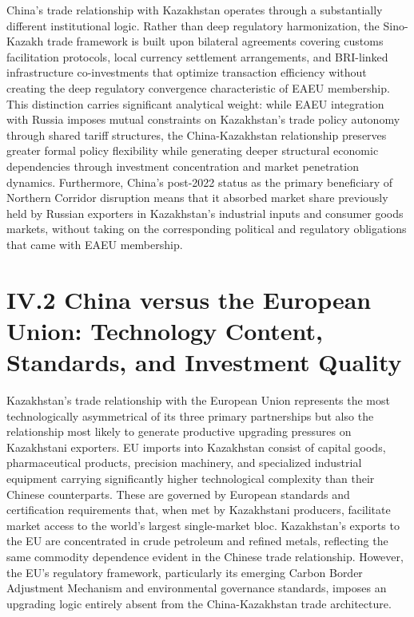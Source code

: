 \documentclass[12pt]{article}
\begin{document}
China's trade relationship with Kazakhstan operates through a substantially different institutional logic. Rather than deep regulatory harmonization, the Sino-Kazakh trade framework is built upon bilateral agreements covering customs facilitation protocols, local currency settlement arrangements, and BRI-linked infrastructure co-investments that optimize transaction efficiency without creating the deep regulatory convergence characteristic of EAEU membership. This distinction carries significant analytical weight: while EAEU integration with Russia imposes mutual constraints on Kazakhstan's trade policy autonomy through shared tariff structures, the China-Kazakhstan relationship preserves greater formal policy flexibility while generating deeper structural economic dependencies through investment concentration and market penetration dynamics. Furthermore, China's post-2022 status as the primary beneficiary of Northern Corridor disruption means that it absorbed market share previously held by Russian exporters in Kazakhstan's industrial inputs and consumer goods markets, without taking on the corresponding political and regulatory obligations that came with EAEU membership.\par

\section{IV.2 China versus the European Union: Technology Content, Standards, and Investment Quality}

Kazakhstan's trade relationship with the European Union represents the most technologically asymmetrical of its three primary partnerships but also the relationship most likely to generate productive upgrading pressures on Kazakhstani exporters. EU imports into Kazakhstan consist of capital goods, pharmaceutical products, precision machinery, and specialized industrial equipment carrying significantly higher technological complexity than their Chinese counterparts. These are governed by European standards and certification requirements that, when met by Kazakhstani producers, facilitate market access to the world's largest single-market bloc. Kazakhstan's exports to the EU are concentrated in crude petroleum and refined metals, reflecting the same commodity dependence evident in the Chinese trade relationship. However, the EU's regulatory framework, particularly its emerging Carbon Border Adjustment Mechanism and environmental governance standards, imposes an upgrading logic entirely absent from the China-Kazakhstan trade architecture.\par
\end{document}

